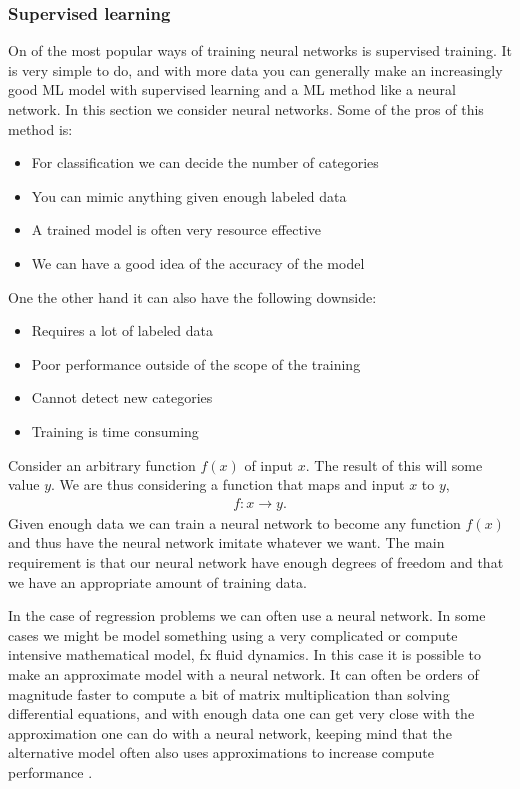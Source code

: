 \documentclass[12pt,a4paper]{article} %
\numberwithin{equation}{section}
\begin{document}
		\subsubsection{Supervised learning}
			On of the most popular ways of training neural networks is supervised training. It is very simple to do, and with more data you can generally make an increasingly good ML model with supervised learning and a ML method like a neural network. In this section we consider neural networks. Some of the pros of this method is: 
			\begin{itemize}
				\item For classification we can decide the number of categories
				\item You can mimic anything given enough labeled data
				\item A trained model is often very resource effective
				\item We can have a good idea of the accuracy of the model
			\end{itemize}
			One the other hand it can also have the following downside:
			\begin{itemize}
				\item Requires a lot of labeled data
				\item Poor performance outside of the scope of the training
				\item Cannot detect new categories
				\item Training is time consuming
			\end{itemize}			
			Consider an arbitrary function $f(x)$ of input $x$. The result of this will some value $y$. We are thus considering a function that maps and input $x$ to $y$,
			\begin{gather}
				f: x \rightarrow y.
			\end{gather}
			Given enough data we can train a neural network to become any function $f(x)$ and thus have the neural network imitate whatever we want. The main requirement is that our neural network have enough degrees of freedom and that we have an appropriate amount of training data. 
			
			In the case of regression problems we can often use a neural network. In some cases we might be model something using a very complicated or compute intensive mathematical model, fx fluid dynamics. In this case it is possible to make an approximate model with a neural network. It can often be orders of magnitude faster to compute a bit of matrix multiplication than solving differential equations, and with enough data one can get very close with the approximation one can do with a neural network, keeping mind that the alternative model often also uses approximations to increase compute performance \cite{fukami:2019, wang:2019, vandal:2017, ling:2016}.
			
\end{document}
